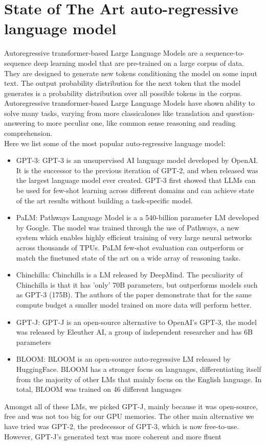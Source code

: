 \section{State of The Art auto-regressive language model}
Autoregressive transformer-based Large Language Models are a sequence-to-sequence deep learning model that are pre-trained on a large corpus of data. They are designed to generate new tokens conditioning the model on some input text. The output probability distribution for the next token that the model generates is a probability distribution over all possible tokens in the corpus. \\
Autoregressive transformer-based Large Language Models have shown ability to solve many tasks\cite{gpt3}, varying from more classicalones like translation and question-answering to more peculiar one, like common sense reasoning and reading comprehension. \\
Here we list some of the most popular auto-regressive language model:
\begin{itemize}
    \item GPT-3: GPT-3 is an unsupervised AI language model developed by OpenAI. It is the successor to the previous iteration of GPT-2, and when released was the largest language model ever created. GPT-3 first showed that LLMs can be used for few-shot learning across different domains and can achieve state of the art results without  building a task-specific model.
    \item PaLM: Pathways Language Model is a a 540-billion parameter LM developed by Google. The model was trained through the use of Pathways, a new system which enables highly efficient training of very large neural networks across thousands of TPUs. PaLM few-shot evaluation can outperform or match the finetuned state of the art on a wide array of reasoning tasks.
    \item Chinchilla: Chinchilla is a LM released by DeepMind. The peculiarity of Chinchilla is that it has 'only' 70B parameters, but outperforms models such as GPT-3 (175B). The authors of the paper demonstrate that for the same compute budget a smaller model trained on more data will perform better.
    \item GPT-J: GPT-J is an open-source alternative to OpenAI's GPT-3, the model was released by Eleuther AI, a group of independent researcher and has 6B parameters
    \item BLOOM: BLOOM is an open-source auto-regressive LM released by HuggingFace. BLOOM has a stronger focus on languages, differentiating itself from the majority of other LMs that mainly focus on the English language. In total, BLOOM was trained on 46 different languages
\end{itemize}
Amongst all of these LMs, we picked GPT-J, mainly because it was open-source, free and was not too big for our GPU memories. The other main alternative we have tried was GPT-2, the predecessor of GPT-3, which is now free-to-use. However, GPT-J's generated text was more coherent and more fluent \\

